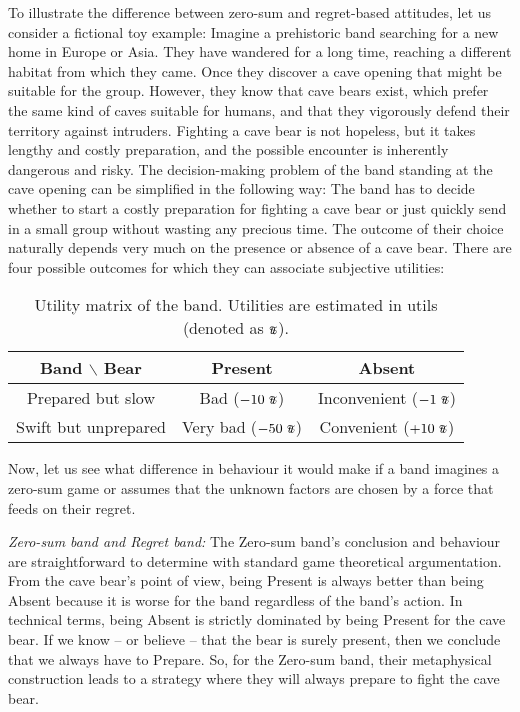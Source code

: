 \documentclass{article}
\newcommand{\util}{\scalebox{0.75}{\text{\Pfund}}}
\begin{document}
To illustrate the difference between zero-sum and regret-based attitudes, let us consider a fictional toy example:
Imagine a prehistoric band searching for a new home in Europe or Asia. They have wandered for a long time, reaching a different habitat from which they came. Once they discover a cave opening that might be suitable for the group. However, they know that cave bears exist, which prefer the same kind of caves suitable for humans, and that they vigorously defend their territory against intruders.
Fighting a cave bear is not hopeless, but it takes lengthy and costly preparation, and the possible encounter is inherently dangerous and risky.
The decision-making problem of the band standing at the cave opening can be simplified in the following way:
The band has to decide whether to start a costly preparation for fighting a cave bear or just quickly send in a small group without wasting any precious time.
The outcome of their choice naturally depends very much on the presence or absence of a cave bear.
There are four possible outcomes for which they can associate subjective utilities:


\begin{table}[h!]
    \centering
    \begin{tabular}{c|cc}
        Band $\backslash$ Bear & Present & Absent \\
        \hline
        Prepared but slow & Bad ($-10\ \util$) & Inconvenient ($-1\ \util$) \\
        Swift but unprepared & Very bad ($-50\ \util$) & Convenient ($+10\ \util$) \\
    \end{tabular}
    \caption{Utility matrix of the band. Utilities are estimated in utils (denoted as $\util$).}
    \label{tab:BandBearUtilityMatrix}
\end{table}

Now, let us see what difference in behaviour it would make if a band imagines a zero-sum game or assumes that the unknown factors are chosen by a force that feeds on their regret.

{\it Zero-sum band and Regret band:}
The Zero-sum band's conclusion and behaviour are straightforward to determine with standard game theoretical argumentation.
From the cave bear’s point of view, being Present is always better than being Absent because it is worse for the band regardless of the band's action. In technical terms, being Absent is strictly dominated by being Present for the cave bear.
If we know – or believe – that the bear is surely present, then we conclude that we always have to Prepare. So, for the Zero-sum band, their metaphysical construction leads to a strategy where they will always prepare to fight the cave bear.
\end{document}
